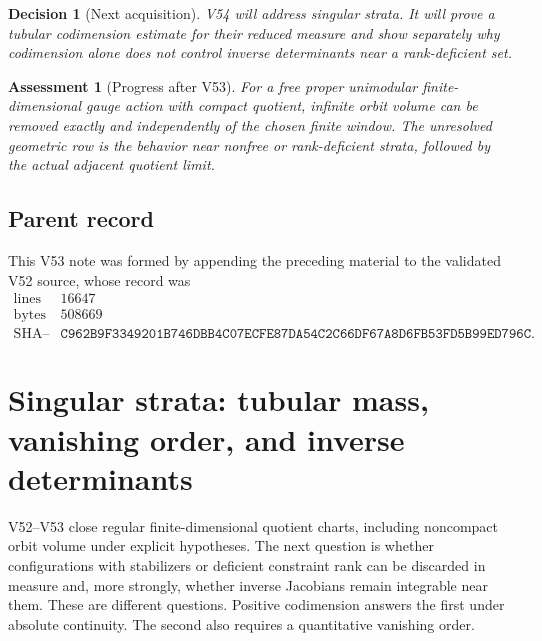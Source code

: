\documentclass[11pt]{article}
\newtheorem{assessment}[theorem]{Assessment}
\newtheorem{decision}[theorem]{Decision}
\begin{document}
\begin{decision}[Next acquisition]
\label{dec:v11v53-next}
V54 will address singular strata.  It will prove a tubular
codimension estimate for their reduced measure and show separately why
codimension alone does not control inverse determinants near a
rank-deficient set.
\end{decision}

\begin{assessment}[Progress after V53]
\label{ass:v11v53-status}
For a free proper unimodular finite-dimensional gauge action with
compact quotient, infinite orbit volume can be removed exactly and
independently of the chosen finite window.  The unresolved geometric
row is the behavior near nonfree or rank-deficient strata, followed by
the actual adjacent quotient limit.
\end{assessment}

\subsection{Parent record}

This V53 note was formed by appending the preceding material to the
validated V52 source, whose record was
\[
\begin{array}{c|c}
\text{lines}&16647\\
\text{bytes}&508669\\
\text{SHA--256}&
\texttt{C962B9F3349201B746DBB4C07ECFE87DA54C2C66DF67A8D6FB53FD5B99ED796C}.
\end{array}                                                     \tag{53.11}
\]


\section{Singular strata: tubular mass, vanishing order, and inverse
determinants}
\label{sec:v11v54}

V52--V53 close regular finite-dimensional quotient charts, including
noncompact orbit volume under explicit hypotheses.  The next question
is whether configurations with stabilizers or deficient constraint
rank can be discarded in measure and, more strongly, whether inverse
Jacobians remain integrable near them.  These are different questions.
Positive codimension answers the first under absolute continuity.
The second also requires a quantitative vanishing order.
\end{document}
